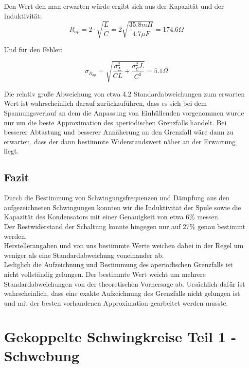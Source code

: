 \documentclass[12pt,a4paper]{article}
\begin{document}
Den Wert den man erwarten würde ergibt sich aus der Kapazität und der Induktivität:
\begin{equation}
R_{ap}=2\cdot \sqrt{\frac{L}{C}}=2\sqrt{\frac{35.8mH}{4.7\mu F}}=174.6\Omega
\end{equation}

Und für den Fehler:

\begin{equation}
\sigma_{R_{ap}}=\sqrt{\frac{\sigma_L^2}{CL}+\frac{\sigma_C^2 L}{C^3}}=5.1 \Omega
\end{equation}

Die relativ große Abweichung von etwa 4.2 Standardabweichungen zum erwarten Wert ist wahrscheinlich darauf zurückzuführen, dass es sich bei dem Spannungsverlauf an dem die Anpassung von Einhüllenden vorgenommen wurde nur um die beste Approximation des aperiodischen Grenzfalls handelt. Bei besserer Abtastung und besserer Annäherung an den Grenzfall wäre dann zu erwarten, dass der dann bestimmte Widerstandswert näher an der Erwartung liegt.

\subsection{Fazit}
Durch die Bestimmung von Schwingungsfrequenzen und Dämpfung aus den aufgezeichneten Schwingungen konnten wir die Induktivität der Spule sowie die Kapazität des Kondensators mit einer Genauigkeit von etwa 6\% messen.\\
Der Restwiderstand der Schaltung konnte hingegen nur auf 27\% genau bestimmt werden.\\
Herstellerangaben und von uns bestimmte Werte weichen dabei in der Regel um weniger als eine Standardabweichung voneinander ab.\\
Lediglich die Aufzeichnung und Bestimmung des aperiodischen Grenzfalls ist nicht vollständig gelungen. Der bestimmte Wert weicht um mehrere Standardabweichungen von der theoretischen Vorhersage ab. Ursächlich dafür ist wahrscheinlich, dass eine exakte Aufzeichnung des Grenzfalls nicht gelungen ist und mit der besten vorhandenen Approximation gearbeitet werden musste.


\newpage
\section{Gekoppelte Schwingkreise Teil 1 - Schwebung}
\end{document}
